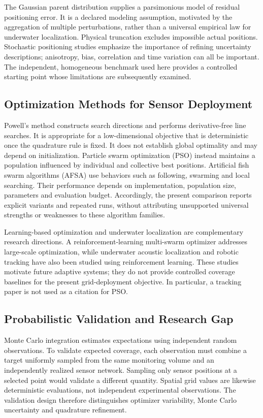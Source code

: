 \documentclass[fleqn,10pt]{wlscirep}
\begin{document}
The Gaussian parent distribution supplies a parsimonious model of residual positioning error. It is a declared modeling assumption, motivated by the aggregation of multiple perturbations, rather than a universal empirical law for underwater localization. Physical truncation excludes impossible actual positions. Stochastic positioning studies emphasize the importance of refining uncertainty descriptions\cite{zhao2020}; anisotropy, bias, correlation and time variation can all be important. The independent, homogeneous benchmark used here provides a controlled starting point whose limitations are subsequently examined.

\subsection*{Optimization Methods for Sensor Deployment}
Powell's method constructs search directions and performs derivative-free line searches\cite{powell1964}. It is appropriate for a low-dimensional objective that is deterministic once the quadrature rule is fixed. It does not establish global optimality and may depend on initialization. Particle swarm optimization (PSO) instead maintains a population influenced by individual and collective best positions\cite{kennedy1995,clerc2002}. Artificial fish swarm algorithms (AFSA) use behaviors such as following, swarming and local searching\cite{li2002}. Their performance depends on implementation, population size, parameters and evaluation budget. Accordingly, the present comparison reports explicit variants and repeated runs, without attributing unsupported universal strengths or weaknesses to these algorithm families.

Learning-based optimization and underwater localization are complementary research directions. A reinforcement-learning multi-swarm optimizer addresses large-scale optimization\cite{wang2024}, while underwater acoustic localization and robotic tracking have also been studied using reinforcement learning\cite{zhou2024,masmitja2023}. These studies motivate future adaptive systems; they do not provide controlled coverage baselines for the present grid-deployment objective. In particular, a tracking paper is not used as a citation for PSO.

\subsection*{Probabilistic Validation and Research Gap}
Monte Carlo integration estimates expectations using independent random observations\cite{metropolis1949,papoulis2002}. To validate expected coverage, each observation must combine a target uniformly sampled from the same monitoring volume and an independently realized sensor network. Sampling only sensor positions at a selected point would validate a different quantity. Spatial grid values are likewise deterministic evaluations, not independent experimental observations. The validation design therefore distinguishes optimizer variability, Monte Carlo uncertainty and quadrature refinement.
\end{document}
